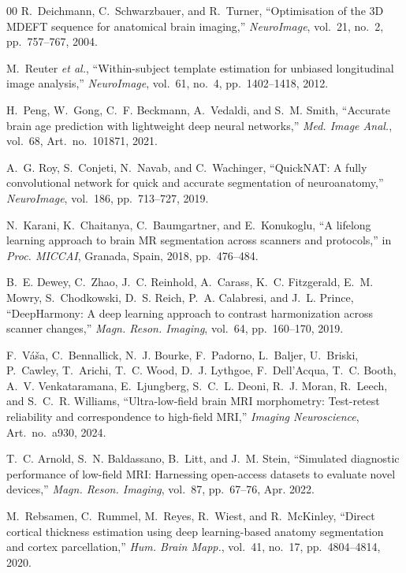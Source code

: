 \documentclass{ieeeaccess}
\begin{document}
\begin{thebibliography}{00}
R.~Deichmann, C.~Schwarzbauer, and R.~Turner,
``Optimisation of the 3D MDEFT sequence for anatomical brain imaging,''
\emph{NeuroImage}, vol.~21, no.~2, pp.~757--767, 2004.

M.~Reuter \emph{et al.},
``Within-subject template estimation for unbiased longitudinal image
analysis,''
\emph{NeuroImage}, vol.~61, no.~4, pp.~1402--1418, 2012.

H.~Peng, W.~Gong, C.~F. Beckmann, A.~Vedaldi, and S.~M. Smith,
``Accurate brain age prediction with lightweight deep neural networks,''
\emph{Med. Image Anal.}, vol.~68, Art.~no.~101871, 2021.

A.~G. Roy, S.~Conjeti, N.~Navab, and C.~Wachinger,
``QuickNAT: A fully convolutional network for quick and accurate
segmentation of neuroanatomy,''
\emph{NeuroImage}, vol.~186, pp.~713--727, 2019.

N.~Karani, K.~Chaitanya, C.~Baumgartner, and E.~Konukoglu,
``A lifelong learning approach to brain MR segmentation across scanners
and protocols,''
in \emph{Proc. MICCAI}, Granada, Spain, 2018, pp.~476--484.

B.~E. Dewey, C.~Zhao, J.~C. Reinhold, A.~Carass, K.~C. Fitzgerald,
E.~M. Mowry, S.~Chodkowski, D.~S. Reich, P.~A. Calabresi, and J.~L. Prince,
``DeepHarmony: A deep learning approach to contrast harmonization across
scanner changes,''
\emph{Magn. Reson. Imaging}, vol.~64, pp.~160--170, 2019.

F.~V{\'a}{\v s}a, C.~Bennallick, N.~J. Bourke, F.~Padorno,
L.~Baljer, U.~Briski, P.~Cawley, T.~Arichi, T.~C. Wood,
D.~J. Lythgoe, F.~Dell'Acqua, T.~C. Booth, A.~V. Venkataramana,
E.~Ljungberg, S.~C.~L. Deoni, R.~J. Moran, R.~Leech,
and S.~C.~R. Williams,
``Ultra-low-field brain MRI morphometry: Test-retest reliability and
correspondence to high-field MRI,''
\emph{Imaging Neuroscience}, Art.~no.~a930, 2024.

T.~C. Arnold, S.~N. Baldassano, B.~Litt, and J.~M. Stein,
``Simulated diagnostic performance of low-field MRI: Harnessing
open-access datasets to evaluate novel devices,''
\emph{Magn. Reson. Imaging}, vol.~87, pp.~67--76, Apr. 2022.

M.~Rebsamen, C.~Rummel, M.~Reyes, R.~Wiest, and R.~McKinley,
``Direct cortical thickness estimation using deep learning-based anatomy
segmentation and cortex parcellation,''
\emph{Hum. Brain Mapp.}, vol.~41, no.~17, pp.~4804--4814, 2020.


\end{thebibliography}
\end{document}
